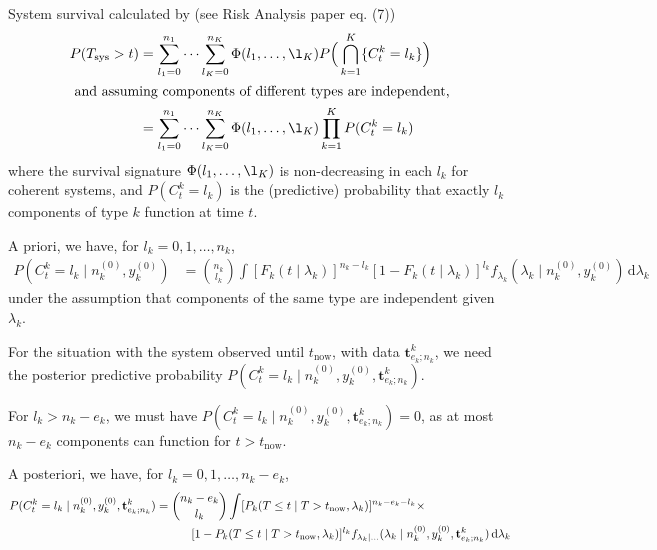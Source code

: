 \documentclass[12pt,a4paper,fleqn]{narms}
\newcommand{\dd}{\,\mathrm{d}}
\newcommand{\mbf}[1]{\mathbf{#1}}
\newcommand{\uz}{^{(0)}} %
\def\Tsys{T_\text{sys}}
\def\ykz{y\uz_k}
\def\nkz{n\uz_k}
\def\tnow{t_\text{now}}
\begin{document}

System survival calculated by (see Risk Analysis paper eq. (7))
\begin{align}
P(\Tsys > t) &= \sum_{l_1=0}^{n_1} \cdots \sum_{l_K=0}^{n_K} \Phi(l_1,\ldots,\l_K) P\Big( \bigcap_{k=1}^K \{ C^k_t = l_k\} \Big) \\
\intertext{ and assuming components of different types are independent,}
             &= \sum_{l_1=0}^{n_1} \cdots \sum_{l_K=0}^{n_K} \Phi(l_1,\ldots,\l_K) \prod_{k=1}^K P(C^k_t = l_k)
\end{align}
where the survival signature $\Phi(l_1,\ldots,\l_K)$ is non-decreasing in each $l_k$ for coherent systems,
and $P(C^k_t = l_k)$ is the (predictive) probability that exactly $l_k$ components of type $k$ function at time $t$.

A priori, we have, for $l_k = 0,1,\ldots, n_k$,
\begin{align}
P(C^k_t = l_k\mid\nkz,\ykz)
 &= { n_k \choose l_k} \int [F_k(t \mid\lambda_k)]^{n_k-l_k}
                        [1 - F_k(t \mid\lambda_k)]^{l_k} f_{\lambda_k}(\lambda_k\mid\nkz,\ykz) \dd \lambda_k
\end{align}
under the assumption that components of the same type are independent given $\lambda_k$.

\bigskip

For the situation with the system observed until $\tnow$, with data $\mbf{t}^k_{e_k;n_k}$,
we need the posterior predictive probability $P(C^k_t = l_k\mid\nkz,\ykz, \mbf{t}^k_{e_k;n_k})$.

For $l_k > n_k - e_k$, we must have $P(C^k_t = l_k\mid\nkz,\ykz, \mbf{t}^k_{e_k;n_k}) = 0$,
as at most $n_k - e_k$ components can function for $t > \tnow$.


A posteriori, we have, for $l_k = 0,1,\ldots, n_k - e_k$,
\begin{align}
P(C^k_t = l_k\mid\nkz,\ykz, \mbf{t}^k_{e_k;n_k})
 &= { n_k - e_k \choose l_k} \int [P_k(T \leq t \mid T > \tnow, \lambda_k)]^{n_k - e_k - l_k} \times \\ & \hspace*{7ex}
                              [1 - P_k(T \leq t \mid T > \tnow, \lambda_k)]^{l_k}
    f_{\lambda_k\mid\ldots}(\lambda_k\mid\nkz,\ykz,\mbf{t}^k_{e_k;n_k}) \dd \lambda_k
\end{align}
\end{document}
